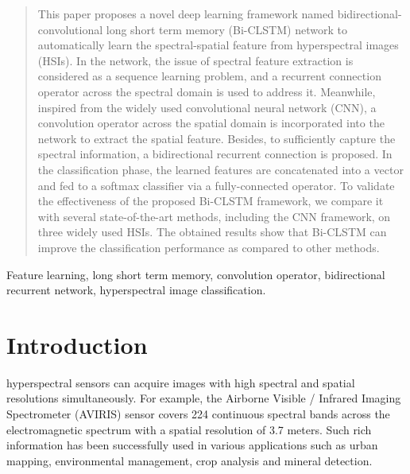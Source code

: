 \documentclass[12pt,onecolumn]{IEEEtran}
\begin{document}
\begin{spacing}{2}
\begin{abstract}
This paper proposes a novel deep learning framework named bidirectional-convolutional long short term memory (Bi-CLSTM) network to automatically learn the spectral-spatial feature from hyperspectral images (HSIs). In the network, the issue of spectral feature extraction is considered as a sequence learning problem, and a recurrent connection operator across the spectral domain is used to address it. Meanwhile, inspired from the widely used convolutional neural network (CNN), a convolution operator across the spatial domain is incorporated into the network to extract the spatial feature. Besides, to sufficiently capture the spectral information, a bidirectional recurrent connection is proposed. In the classification phase, the learned features are concatenated into a vector and fed to a softmax classifier via  a fully-connected operator. To validate the effectiveness of the proposed Bi-CLSTM framework, we compare it with several state-of-the-art methods, including the CNN framework, on three widely used HSIs. The obtained results show that Bi-CLSTM can improve the classification performance as compared to other methods.

\end{abstract}

\begin{IEEEkeywords}
Feature learning, long short term memory, convolution operator, bidirectional recurrent network, hyperspectral image classification. %
\end{IEEEkeywords}
\IEEEpeerreviewmaketitle



\section{Introduction}
 hyperspectral sensors can acquire images with high spectral and spatial resolutions simultaneously. For example, the Airborne Visible / Infrared Imaging Spectrometer (AVIRIS) sensor covers 224 continuous spectral bands across the electromagnetic spectrum with a spatial resolution of 3.7 meters. Such rich information has been successfully used in various applications such as urban mapping, environmental management, crop analysis and mineral detection. %


\end{spacing}
\end{document}
